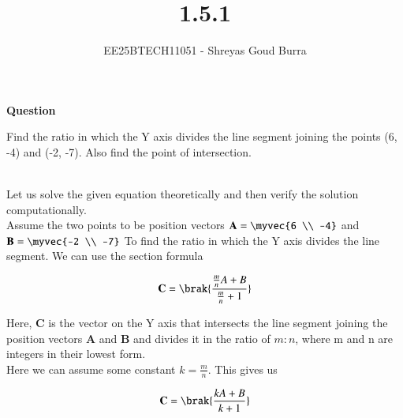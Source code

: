 \documentclass[journal]{IEEEtran}
\begin{document}
%
\vspace{3cm}

\title{1.5.1}
\author{EE25BTECH11051 - Shreyas Goud Burra}
\maketitle
{\let\newpage\relax\maketitle}

\renewcommand{\thefigure}{\theenumi}
\renewcommand{\thetable}{\theenumi}
\setlength{\intextsep}{10pt} %


\renewcommand{\thetable}{\theenumi}


\textbf{Question}

Find the ratio in which the Y axis divides the line segment joining the points (6, -4)
and (-2, -7). Also find the point of intersection.

\solution \\

Let us solve the given equation theoretically and then verify the solution computationally. \\

Assume the two points to be position vectors $\textbf{A} = \myvec{6 \\ -4}$ and $\textbf{B} = \myvec{-2 \\ -7}$
To find the ratio in which the Y axis divides the line segment. We can use the section formula

\begin{align}
    \textbf{C} = \brak{\frac{\frac{m}{n}A+B}{\frac{m}{n}+1}}
    \label{0.1}
\end{align}


Here, $\textbf{C}$ is the vector on the Y axis that intersects the line segment joining the position vectors $\textbf{A}$ and $\textbf{B}$ and divides it in the ratio of $m:n$, where m and n are integers in their lowest form.\\ 

Here we can assume some constant $k=\frac{m}{n}$. This gives us

\begin{align}
    \textbf{C} = \brak{\frac{kA+B}{k+1}}
    \label{0.2}
\end{align}
\end{document}
